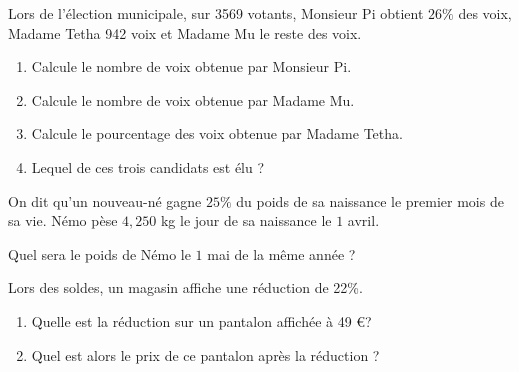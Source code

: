 \begin{pageAuto} 

\ExoAuto

Lors de l'élection municipale, sur 3569 votants, Monsieur Pi obtient $26\%$ des voix, Madame Tetha 942 voix et Madame Mu le reste des voix.

\begin{enumerate}[leftmargin=*]
\item Calcule le nombre de voix obtenue par Monsieur Pi. 
\item Calcule le nombre de voix obtenue par Madame Mu.  
\item Calcule le pourcentage des voix obtenue par Madame Tetha.  
\item Lequel de ces trois candidats est élu ?  
\end{enumerate}


\ExoAuto

On dit qu'un nouveau-né gagne $25\%$ du poids de sa naissance le premier mois de sa vie. Némo pèse $4,250$ kg le jour de sa naissance le $1$ avril.

Quel sera le poids de Némo le $1$ mai de la même année ?
  
\ExoAuto

Lors des soldes, un magasin affiche une réduction de 22\%. 
\begin{enumerate}[leftmargin=*]
\item Quelle est la réduction sur un pantalon affichée à 49 \euro ?
\item Quel est alors le prix de ce pantalon après la réduction ?
\end{enumerate}



 
\end{pageAuto}

 
 

